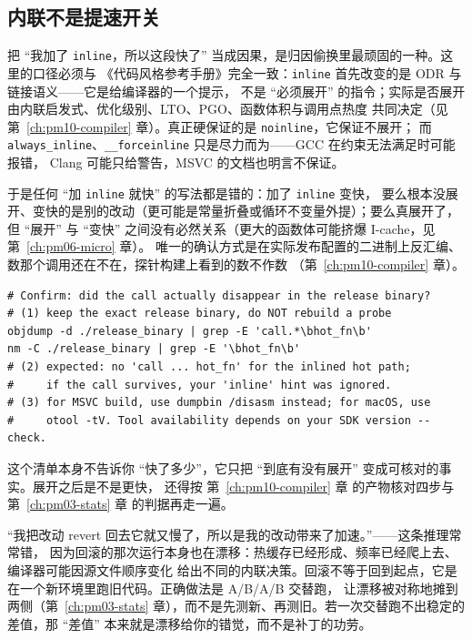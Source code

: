\documentclass[12pt,a4paper,fontset=fandol]{ctexbook}
\newcommand{\Tp}[1]{\texttt{#1}}
\begin{document}
\subsection{内联不是提速开关}

把 ``我加了 \Tp{inline}，所以这段快了'' 当成因果，是归因偷换里最顽固的一种。这里的口径必须与
《代码风格参考手册》完全一致：\Tp{inline} 首先改变的是 ODR 与链接语义——它是给编译器的一个提示，
不是 ``必须展开'' 的指令；实际是否展开由内联启发式、优化级别、LTO、PGO、函数体积与调用点热度
共同决定（见 第~\ref{ch:pm10-compiler} 章）。真正硬保证的是 \Tp{noinline}，它保证不展开；
而 \Tp{always\_inline}、\Tp{\_\_forceinline} 只是尽力而为——GCC 在约束无法满足时可能报错，
Clang 可能只给警告，MSVC 的文档也明言不保证。

于是任何 ``加 \Tp{inline} 就快'' 的写法都是错的：加了 \Tp{inline} 变快，
要么根本没展开、变快的是别的改动（更可能是常量折叠或循环不变量外提）；要么真展开了，
但 ``展开'' 与 ``变快'' 之间没有必然关系（更大的函数体可能挤爆 I-cache，见 第~\ref{ch:pm06-micro} 章）。
唯一的确认方式是在实际发布配置的二进制上反汇编、数那个调用还在不在，探针构建上看到的数不作数
（第~\ref{ch:pm10-compiler} 章）。

\begin{lstlisting}[style=shellstyle, caption={在发布产物上确认展开是否发生（示意命令，非本仓库实测；开关名与工具随版本变，先查自己那套 objdump/nm 支持哪些）}, label={lst:pm15-inline-check}]
# Confirm: did the call actually disappear in the release binary?
# (1) keep the exact release binary, do NOT rebuild a probe
objdump -d ./release_binary | grep -E 'call.*\bhot_fn\b'
nm -C ./release_binary | grep -E '\bhot_fn\b'
# (2) expected: no 'call ... hot_fn' for the inlined hot path;
#     if the call survives, your 'inline' hint was ignored.
# (3) for MSVC build, use dumpbin /disasm instead; for macOS, use
#     otool -tV. Tool availability depends on your SDK version -- check.
\end{lstlisting}

这个清单本身不告诉你 ``快了多少''，它只把 ``到底有没有展开'' 变成可核对的事实。展开之后是不是更快，
还得按 第~\ref{ch:pm10-compiler} 章 的产物核对四步与 第~\ref{ch:pm03-stats} 章 的判据再走一遍。

\begin{warning}[title={补丁有效，因为回滚更慢}]
``我把改动 revert 回去它就又慢了，所以是我的改动带来了加速。''——这条推理常常错，
因为回滚的那次运行本身也在漂移：热缓存已经形成、频率已经爬上去、编译器可能因源文件顺序变化
给出不同的内联决策。回滚不等于回到起点，它是在一个新环境里跑旧代码。正确做法是 A/B/A/B 交替跑，
让漂移被对称地摊到两侧（第~\ref{ch:pm03-stats} 章），而不是先测新、再测旧。若一次交替跑不出稳定的
差值，那 ``差值'' 本来就是漂移给你的错觉，而不是补丁的功劳。
\end{warning}
\end{document}
